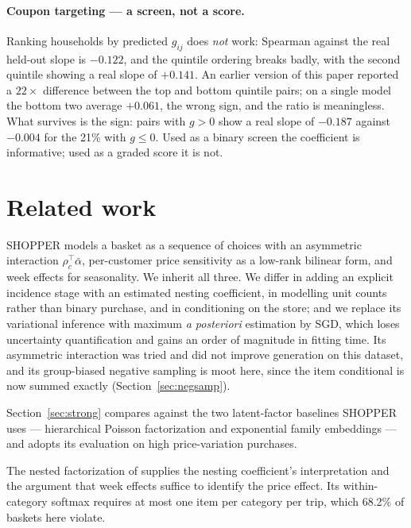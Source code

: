 \documentclass[11pt]{article}
\begin{document}
\paragraph{Coupon targeting --- a screen, not a score.} Ranking households by predicted
$g_{ij}$ does \emph{not} work: Spearman against the real held-out slope is $-0.122$, and the
quintile ordering breaks badly, with the second quintile showing a real slope of $+0.141$.
An earlier version of this paper reported a $22\times$ difference between the top and bottom
quintile pairs; on a single model the bottom two average $+0.061$, the wrong sign, and the
ratio is meaningless. What survives is the sign: pairs with $g>0$ show a real slope of
$-0.187$ against $-0.004$ for the 21\% with $g\leq0$. Used as a binary screen the
coefficient is informative; used as a graded score it is not.

\section{Related work}
\label{sec:related}

SHOPPER \cite{shopper} models a basket as a sequence of choices with an asymmetric
interaction $\rho_c^{\top}\bar\alpha$, per-customer price sensitivity as a low-rank
bilinear form, and week effects for seasonality. We inherit all three. We differ in
adding an explicit incidence stage with an estimated nesting coefficient, in modelling
unit counts rather than binary purchase, and in conditioning on the store; and we replace
its variational inference with maximum \emph{a posteriori} estimation by SGD, which loses
uncertainty quantification and gains an order of magnitude in fitting time.
Its asymmetric interaction was tried and did not improve generation on this dataset, and
its group-biased negative sampling is moot here, since the item conditional is now summed
exactly (Section~\ref{sec:negsamp}).

Section~\ref{sec:strong} compares against the two latent-factor baselines SHOPPER
uses --- hierarchical Poisson factorization \cite{hpf} and exponential family embeddings
\cite{bemb} --- and adopts its evaluation on high price-variation purchases.

The nested factorization of \cite{nf} supplies the nesting coefficient's interpretation
and the argument that week effects suffice to identify the price effect. Its
within-category softmax requires at most one item per category per trip, which
68.2\% of baskets here violate.

\end{document}
